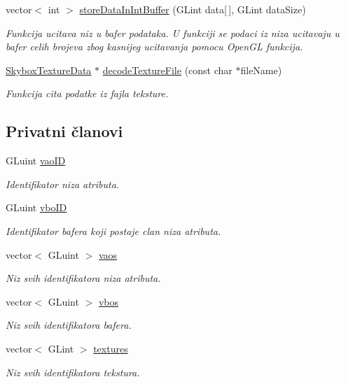 \begin{DoxyCompactItemize}
vector$<$ int $>$ \hyperlink{classcore_1_1VaoLoader_ab2c24b482be973465c548b03bf5df3af}{store\+Data\+In\+Int\+Buffer} (G\+Lint data\mbox{[}$\,$\mbox{]}, G\+Lint data\+Size)
\begin{DoxyCompactList}\small\item\em Funkcija ucitava niz u bafer podataka. U funkciji se podaci iz niza ucitavaju u bafer celih brojeva zbog kasnijeg ucitavanja pomocu Open\+GL funkcija. \end{DoxyCompactList}\item 
\hyperlink{classtexture_1_1SkyboxTextureData}{Skybox\+Texture\+Data} $\ast$ \hyperlink{classcore_1_1VaoLoader_a8310742834449c159828f87e771a5258}{decode\+Texture\+File} (const char $\ast$file\+Name)
\begin{DoxyCompactList}\small\item\em Funkcija cita podatke iz fajla teksture. \end{DoxyCompactList}\end{DoxyCompactItemize}
\subsection*{Privatni članovi}
\begin{DoxyCompactItemize}
\item 
G\+Luint \hyperlink{classcore_1_1VaoLoader_a09fec3fcaf674c66046a859e60c9c674}{vao\+ID}
\begin{DoxyCompactList}\small\item\em Identifikator niza atributa. \end{DoxyCompactList}\item 
G\+Luint \hyperlink{classcore_1_1VaoLoader_a4bc8031f15ad1b7c7eff491f926b93e4}{vbo\+ID}
\begin{DoxyCompactList}\small\item\em Identifikator bafera koji postaje clan niza atributa. \end{DoxyCompactList}\item 
vector$<$ G\+Luint $>$ \hyperlink{classcore_1_1VaoLoader_ad37e6f10d175e35a6fce4b9f76b559e2}{vaos}
\begin{DoxyCompactList}\small\item\em Niz svih identifikatora niza atributa. \end{DoxyCompactList}\item 
vector$<$ G\+Luint $>$ \hyperlink{classcore_1_1VaoLoader_a8866245dbda8794e13956115557159a2}{vbos}
\begin{DoxyCompactList}\small\item\em Niz svih identifikatora bafera. \end{DoxyCompactList}\item 
vector$<$ G\+Lint $>$ \hyperlink{classcore_1_1VaoLoader_a6f2a03c0bca3b9c8211215014747cbaa}{textures}
\begin{DoxyCompactList}\small\item\em Niz svih identifikatora tekstura. \end{DoxyCompactList}\end{DoxyCompactItemize}


